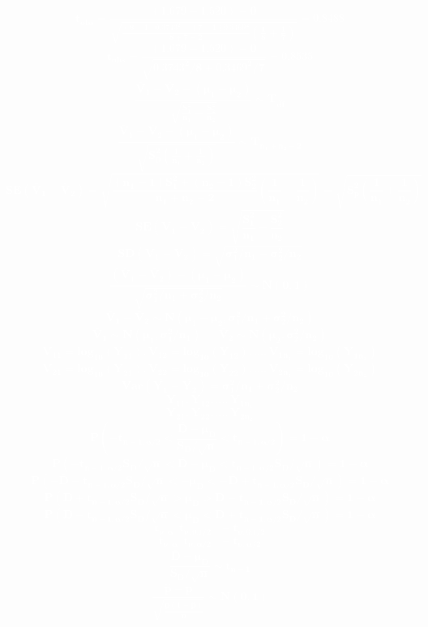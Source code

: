\documentclass[12pt,portrait,semhelv,semrot]{article}
\begin{document}
\normalsize


\textcolor{white}{
	\textbf{
$$\boldsymbol{t_{obs} = \frac{(1.679-1.520)-0}{\sqrt{\frac{(8-1)0.3743^2+(7-1)0.3469^2}{8+7-2}\left(\frac{1}{8}+\frac{1}{7}\right)}} = 0.8488 }$$
$$\boldsymbol{t_{obs} = \frac{(1.679-1.520)-0}{\sqrt{0.3743^2/8+0.3469^2/7}} = 0.8535 }$$
$$\boldsymbol{\frac{\bar{V}_1-\bar{V}_2 - (\mu_1-\mu_2)}{\sqrt{\frac{S_1^2}{n_1}+\frac{S_2^2}{n_2}}} \sim T_{\hat{df}}}$$
$$\boldsymbol{\frac{\bar{V}_1-\bar{V}_2 - (\mu_1-\mu_2)}{\sqrt{S_p^2\left(\frac{1}{n_1}+\frac{1}{n_2}\right)}} \sim T_{n_1+n_2-2}}$$
$$\boldsymbol{SE(\bar{V}_1-\bar{V}_2) = \sqrt{\frac{(n_1-1)S_1^2+(n_2-1)S_2^2}{n_1+n_2-2}\left(\frac{1}{n_1}+\frac{1}{n_2}\right)} = \sqrt{S_p^2\left(\frac{1}{n_1}+\frac{1}{n_2}\right)}}$$
$$\boldsymbol{SE(\bar{V}_1-\bar{V}_2) = \sqrt{\frac{S_1^2}{n_1}+\frac{S^2_2}{n_2}}}$$
$$\boldsymbol{SD(\bar{V}_1-\bar{V}_2) = \sqrt{\sigma^2_1/n_1+ \sigma^2_2/n_2}}$$
$$\boldsymbol{\frac{(\bar{V}_1-\bar{V}_2) - (\mu_1-\mu_2)}{\sqrt{\sigma^2_1/n_1+ \sigma^2_2/n_2}}\sim N(0,1)}$$
$$\boldsymbol{\bar{V}_1-\bar{V}_2 \sim N(\mu_1-\mu_2, \sigma^2_1/n_1+ \sigma^2_2/n_2)}$$
$$\boldsymbol{\bar{V}_1 \sim N(\mu_1,\sigma^2_1/n_1)~~~~~~~\bar{V}_2 \sim N(\mu_2,\sigma^2_2/n_2)}$$
$$\boldsymbol{V_{11} = log_{10}(Y_{11}), V_{12} = log_{10}(Y_{12}), ..., V_{1n_1} = log_{10}(Y_{1n_1})}$$
$$\boldsymbol{V_{21} = log_{10}(Y_{21}), V_{22} = log_{10}(Y_{22}), ..., V_{2n_1} = log_{10}(Y_{2n_2})}$$
$$\boldsymbol{Var\left(\bar{Y_1}-\bar{Y_2}\right)= \sigma_1^2/n_1+\sigma^2_2/n_2}$$
$$\boldsymbol{Y_{11}, Y_{12}, ..., Y_{1n_1}}$$
$$\boldsymbol{Y_{21}, Y_{22}, ..., Y_{2n_2}}$$
$$\boldsymbol{P\left(-t_{n-1,\alpha/2} < \frac{\bar{D} - \mu_D}{S_D/\sqrt{n}} < t_{n-1,\alpha/2}\right) = 1-\alpha}$$
$$\boldsymbol{P\left(-t_{n-1,\alpha/2}S_D/\sqrt{n} < \bar{D} - \mu_D < t_{n-1,\alpha/2}S_D/\sqrt{n}\right) = 1-\alpha}$$
$$\boldsymbol{P\left(-\bar{D}-t_{n-1,\alpha/2}S_D/\sqrt{n} < - \mu_D < -\bar{D}+t_{n-1,\alpha/2}S_D/\sqrt{n}\right) = 1-\alpha}$$
$$\boldsymbol{P\left(\bar{D}+t_{n-1,\alpha/2}S_D/\sqrt{n} >  \mu_D > \bar{D}-t_{n-1,\alpha/2}S_D/\sqrt{n}\right) = 1-\alpha}$$
$$\boldsymbol{P\left(\bar{D}-t_{n-1,\alpha/2}S_D/\sqrt{n} <  \mu_D <\bar{D}+t_{n-1,\alpha/2}S_D/\sqrt{n} \right) = 1-\alpha}$$
$$\boldsymbol{t_{\nu, \alpha} ~~t_{\nu, 0.1/2}~~~-t_{\nu, 0.1/2}}$$
$$\boldsymbol{t_{\nu, \alpha} ~~t_{\nu, \alpha/2}~~~-t_{\nu, \alpha/2}}$$
$$\boldsymbol{\frac{\bar{D}-\mu_D}{S_D/\sqrt{n}}\sim t_{n-1}}$$
$$\boldsymbol{\frac{\hat{p}-p}{\sqrt{\frac{\hat{p}(1-\hat{p})}{n}}}\sim N(0,1)}$$		
}}
\end{document}

